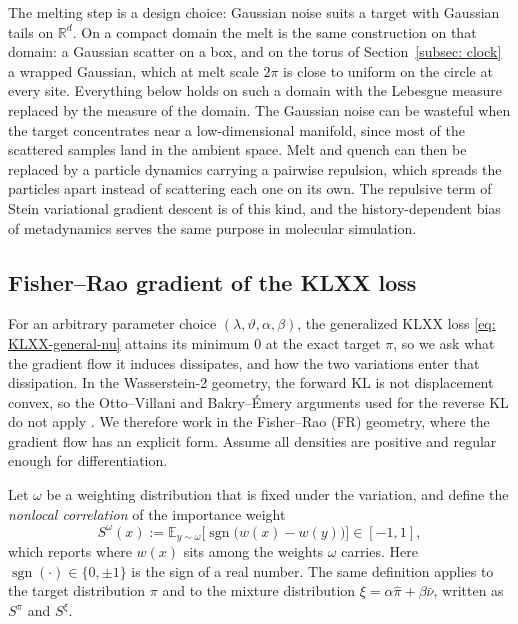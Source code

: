 \documentclass{article}
\begin{document}
\begin{remark}
	The melting step is a design choice: Gaussian noise suits a target with Gaussian tails on $\mathbb R^d$. On a compact domain the melt is the same construction on that domain: a Gaussian scatter on a box, and on the torus of Section~\ref{subsec: clock} a wrapped Gaussian, which at melt scale $2\pi$ is close to uniform on the circle at every site. Everything below holds on such a domain with the Lebesgue measure replaced by the measure of the domain. The Gaussian noise can be wasteful when the target concentrates near a low-dimensional manifold, since most of the scattered samples land in the ambient space. Melt and quench can then be replaced by a particle dynamics carrying a pairwise repulsion, which spreads the particles apart instead of scattering each one on its own. The repulsive term of Stein variational gradient descent \citep{liu2016stein} is of this kind, and the history-dependent bias of metadynamics \citep{laio2002escaping} serves the same purpose in molecular simulation.
\end{remark}

\subsection{Fisher--Rao gradient of the KLXX loss}
\label{subsec: FR-convergence}

For an arbitrary parameter choice $(\lambda,\vartheta,\alpha,\beta)$, the generalized KLXX loss \eqref{eq: KLXX-general-nu} attains its minimum $0$ at the exact target $\pi$, so we ask what the gradient flow it induces dissipates, and how the two variations enter that dissipation.
In the Wasserstein-2 geometry, the forward KL is not displacement convex, so the Otto--Villani and Bakry--{\'E}mery arguments used for the reverse KL do not apply \citep{otto2000generalization,bakry2014analysis}. We therefore work in the Fisher--Rao (FR) geometry, where the gradient flow has an explicit form. Assume all densities are positive and regular enough for differentiation.

Let $\omega$ be a weighting distribution that is fixed under the variation, and define the \emph{nonlocal correlation} of the importance weight
\begin{equation}
	S^{\omega}(x) := \mathbb E_{y\sim\omega}\bigl[\operatorname{sgn}\bigl(w(x)-w(y)\bigr)\bigr] \in [-1,1],
	\label{eq: FR-S}
\end{equation}
which reports where $w(x)$ sits among the weights $\omega$ carries. Here $\operatorname{sgn}(\cdot)\in\{0,\pm1\}$ is the sign of a real number.
The same definition applies to the target distribution $\pi$ and to the mixture distribution $\xi=\alpha\hat\pi+\beta\bar\nu$, written as $S^{\pi}$ and $S^{\xi}$.
\end{document}
